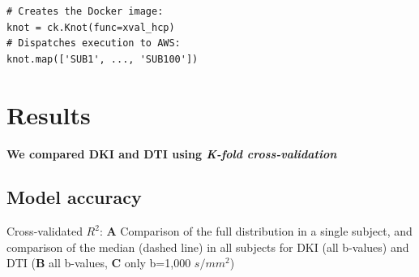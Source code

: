 \documentclass[a0, landscape]{a0poster}
\begin{document}
\begin{multicols}{3}
\begin{minipage}[b]{1\linewidth}
\begin{minipage}[b]{0.55\linewidth}
\begin{lstlisting}
# Creates the Docker image:
knot = ck.Knot(func=xval_hcp)
# Dispatches execution to AWS:
knot.map(['SUB1', ..., 'SUB100'])
\end{lstlisting}
\end{minipage}
\end{minipage}

\columnbreak

\section*{Results}

\noindent \textbf{We compared DKI and DTI using \emph{K-fold cross-validation}}

\subsection*{Model accuracy}
\normalsize

\noindent Cross-validated $R^2$: \textbf{A} Comparison of the full distribution
in a single subject, and comparison of the median (dashed line) in all subjects
for DKI (all b-values) and DTI (\textbf{B} all b-values, \textbf{C} only b=1,000
$s/mm^2$)  \hfill \break


\end{multicols}
\end{document}
